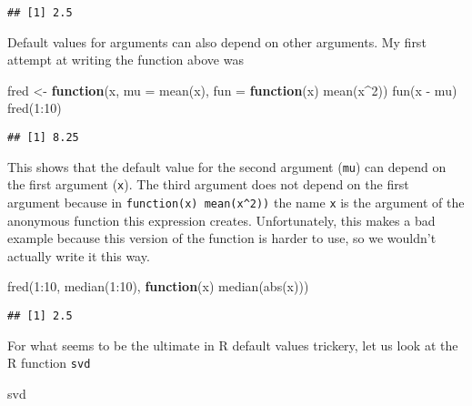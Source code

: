 \documentclass[
]{article}
\newenvironment{Shaded}{\begin{snugshade}}{\end{snugshade}}
\newcommand{\AttributeTok}[1]{\textcolor[rgb]{0.77,0.63,0.00}{#1}}
\newcommand{\ControlFlowTok}[1]{\textcolor[rgb]{0.13,0.29,0.53}{\textbf{#1}}}
\newcommand{\DecValTok}[1]{\textcolor[rgb]{0.00,0.00,0.81}{#1}}
\newcommand{\FunctionTok}[1]{\textcolor[rgb]{0.00,0.00,0.00}{#1}}
\newcommand{\NormalTok}[1]{#1}
\newcommand{\OtherTok}[1]{\textcolor[rgb]{0.56,0.35,0.01}{#1}}
\newcommand{\SpecialCharTok}[1]{\textcolor[rgb]{0.00,0.00,0.00}{#1}}
\begin{document}
\begin{verbatim}
## [1] 2.5
\end{verbatim}

Default values for arguments can also depend on other arguments. My
first attempt at writing the function above was

\begin{Shaded}
\begin{Highlighting}[]
\NormalTok{fred }\OtherTok{\textless{}{-}} \ControlFlowTok{function}\NormalTok{(x, }\AttributeTok{mu =} \FunctionTok{mean}\NormalTok{(x), }\AttributeTok{fun =} \ControlFlowTok{function}\NormalTok{(x) }\FunctionTok{mean}\NormalTok{(x}\SpecialCharTok{\^{}}\DecValTok{2}\NormalTok{))}
    \FunctionTok{fun}\NormalTok{(x }\SpecialCharTok{{-}}\NormalTok{ mu)}
\FunctionTok{fred}\NormalTok{(}\DecValTok{1}\SpecialCharTok{:}\DecValTok{10}\NormalTok{)}
\end{Highlighting}
\end{Shaded}

\begin{verbatim}
## [1] 8.25
\end{verbatim}

This shows that the default value for the second argument (\texttt{mu})
can depend on the first argument (\texttt{x}). The third argument does
not depend on the first argument because in
\texttt{function(x)\ mean(x\^{}2))} the name \texttt{x} is the argument
of the anonymous function this expression creates. Unfortunately, this
makes a bad example because this version of the function is harder to
use, so we wouldn't actually write it this way.

\begin{Shaded}
\begin{Highlighting}[]
\FunctionTok{fred}\NormalTok{(}\DecValTok{1}\SpecialCharTok{:}\DecValTok{10}\NormalTok{, }\FunctionTok{median}\NormalTok{(}\DecValTok{1}\SpecialCharTok{:}\DecValTok{10}\NormalTok{), }\ControlFlowTok{function}\NormalTok{(x) }\FunctionTok{median}\NormalTok{(}\FunctionTok{abs}\NormalTok{(x)))}
\end{Highlighting}
\end{Shaded}

\begin{verbatim}
## [1] 2.5
\end{verbatim}

For what seems to be the ultimate in R default values trickery, let us
look at the R function \texttt{svd}

\begin{Shaded}
\begin{Highlighting}[]
\NormalTok{svd}
\end{Highlighting}
\end{Shaded}
\end{document}

